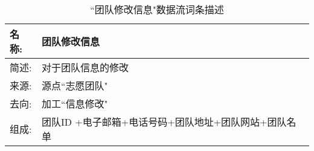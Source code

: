 \begin{table}[H]  
\caption{``团队修改信息"数据流词条描述}  
\begin{center}  
    \begin{tabular}{l p{11cm}} 
        \hline
        \quad 名称:  &   团队修改信息 \\
        \hline
        \quad 简述:  & 对于团队信息的修改 \\
        \hline
        \quad 来源:  & 源点``志愿团队" \\
        \hline
        \quad 去向:  & 加工``信息修改" \\
        \hline
        \quad 组成:  & 团队ID +电子邮箱+电话号码+团队地址+团队网站+团队名单\\
        \hline
    \end{tabular}
    \label{tab1}
\end{center}
\end{table}
